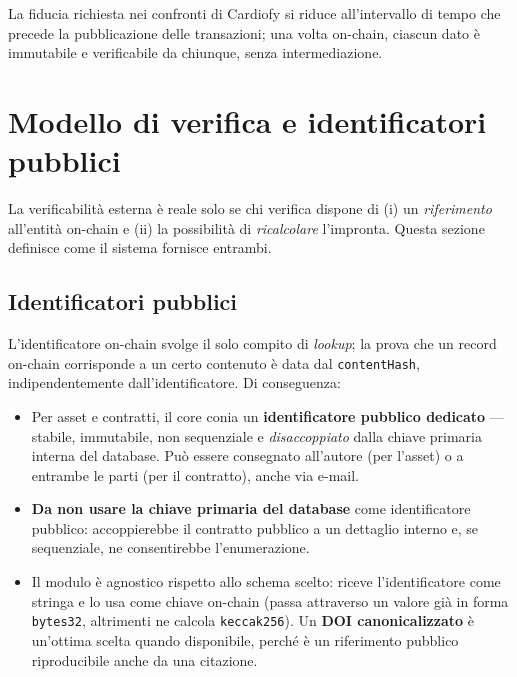 \documentclass[a4paper,11pt]{article}
\begin{document}
\noindent La fiducia richiesta nei confronti di Cardiofy si riduce all'intervallo di tempo che precede la pubblicazione delle transazioni; una volta on-chain, ciascun dato \`e immutabile e verificabile da chiunque, senza intermediazione.

\section{Modello di verifica e identificatori pubblici}\label{sec:verifica}

La verificabilit\`a esterna \`e reale solo se chi verifica dispone di (i) un \emph{riferimento} all'entit\`a on-chain e (ii) la possibilit\`a di \emph{ricalcolare} l'impronta. Questa sezione definisce come il sistema fornisce entrambi.

\subsection{Identificatori pubblici}

L'identificatore on-chain svolge il solo compito di \emph{lookup}; la prova che un record on-chain corrisponde a un certo contenuto \`e data dal \texttt{contentHash}, indipendentemente dall'identificatore. Di conseguenza:

\begin{itemize}[leftmargin=*, itemsep=0.1em]
    \item Per asset e contratti, il core conia un \textbf{identificatore pubblico dedicato} — stabile, immutabile, non sequenziale e \emph{disaccoppiato} dalla chiave primaria interna del database. Pu\`o essere consegnato all'autore (per l'asset) o a entrambe le parti (per il contratto), anche via e-mail.
    \item \textbf{Da non usare la chiave primaria del database} come identificatore pubblico: accoppierebbe il contratto pubblico a un dettaglio interno e, se sequenziale, ne consentirebbe l'enumerazione.
    \item Il modulo \`e agnostico rispetto allo schema scelto: riceve l'identificatore come stringa e lo usa come chiave on-chain (passa attraverso un valore gi\`a in forma \texttt{bytes32}, altrimenti ne calcola \texttt{keccak256}). Un \textbf{DOI canonicalizzato} \`e un'ottima scelta quando disponibile, perch\'e \`e un riferimento pubblico riproducibile anche da una citazione.
\end{itemize}
\end{document}
